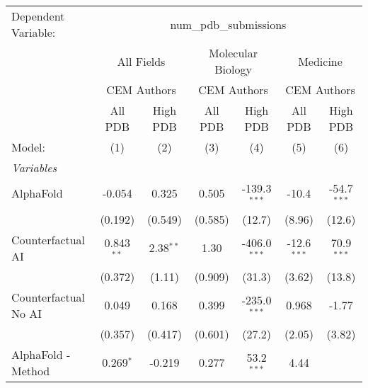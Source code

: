 \begingroup
\centering
\begin{tabular}{lcccccc}
   \tabularnewline \midrule \midrule
   Dependent Variable: & \multicolumn{6}{c}{num\_pdb\_submissions}\\
 & \multicolumn{2}{c}{All Fields} & \multicolumn{2}{c}{Molecular Biology} & \multicolumn{2}{c}{Medicine} \\
\cmidrule(lr){2-3} \cmidrule(lr){4-5} \cmidrule(lr){6-7}
 & \multicolumn{2}{c}{CEM Authors} & \multicolumn{2}{c}{CEM Authors} & \multicolumn{2}{c}{CEM Authors} \\
\cmidrule(lr){2-3} \cmidrule(lr){4-5} \cmidrule(lr){6-7}
 & \multicolumn{1}{c}{All PDB} & \multicolumn{1}{c}{High PDB} & \multicolumn{1}{c}{All PDB} & \multicolumn{1}{c}{High PDB} & \multicolumn{1}{c}{All PDB} & \multicolumn{1}{c}{High PDB} \\
\cmidrule(lr){2-2} \cmidrule(lr){3-3} \cmidrule(lr){4-4} \cmidrule(lr){5-5} \cmidrule(lr){6-6} \cmidrule(lr){7-7}
   Model:                                                     & (1)           & (2)           & (3)          & (4)             & (5)           & (6)\\  
   \midrule
   \emph{Variables}\\
   AlphaFold                                                  & -0.054        & 0.325         & 0.505        & -139.3$^{***}$  & -10.4         & -54.7$^{***}$\\   
                                                              & (0.192)       & (0.549)       & (0.585)      & (12.7)          & (8.96)        & (12.6)\\   
   Counterfactual AI                                          & 0.843$^{**}$  & 2.38$^{**}$   & 1.30         & -406.0$^{***}$  & -12.6$^{***}$ & 70.9$^{***}$\\   
                                                              & (0.372)       & (1.11)        & (0.909)      & (31.3)          & (3.62)        & (13.8)\\   
   Counterfactual No AI                                       & 0.049         & 0.168         & 0.399        & -235.0$^{***}$  & 0.968         & -1.77\\   
                                                              & (0.357)       & (0.417)       & (0.601)      & (27.2)          & (2.05)        & (3.82)\\   
   AlphaFold - Method                                         & 0.269$^{*}$   & -0.219        & 0.277        & 53.2$^{***}$    & 4.44          &   \\   

\end{tabular}
